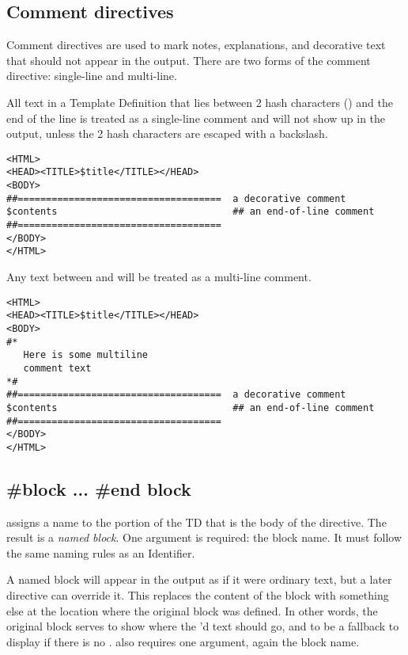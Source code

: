 

\subsection{Comment directives}

Comment directives are used to mark notes, explanations, and decorative text
that should not appear in the output.  There are two forms of the comment
directive: single-line and multi-line.

All text in a Template Definition that lies between 2 hash characters
(\code{\#\#}) and the end of the line is treated as a single-line comment and
will not show up in the output, unless the 2 hash characters are escaped with a
backslash.
\begin{verbatim}
<HTML>
<HEAD><TITLE>$title</TITLE></HEAD>
<BODY>
##====================================  a decorative comment
$contents                               ## an end-of-line comment
##====================================
</BODY>
</HTML>
\end{verbatim}

Any text between \code{\#*} and \code{*\#} will be treated as a multi-line
comment.
\begin{verbatim}
<HTML>
<HEAD><TITLE>$title</TITLE></HEAD>
<BODY>
#*
   Here is some multiline
   comment text
*#
##====================================  a decorative comment
$contents                               ## an end-of-line comment
##====================================
</BODY>
</HTML>
\end{verbatim}


\subsection{\#block ... \#end block}

 assigns a name to the portion of the TD that is the body of the
directive.   The result is a {\em named block}.  One argument is required: the
block name.  It must follow
the same naming rules as an Identifier.

A named block will appear in the output as if it were ordinary text, but a
later  directive can override it.  This replaces the content of
the block with something else at the location where the original block was
defined.  In other words, the original block serves to show where the
'd text should go, and to be a fallback to display if there is
no .   also requires one argument, again the
block name.

